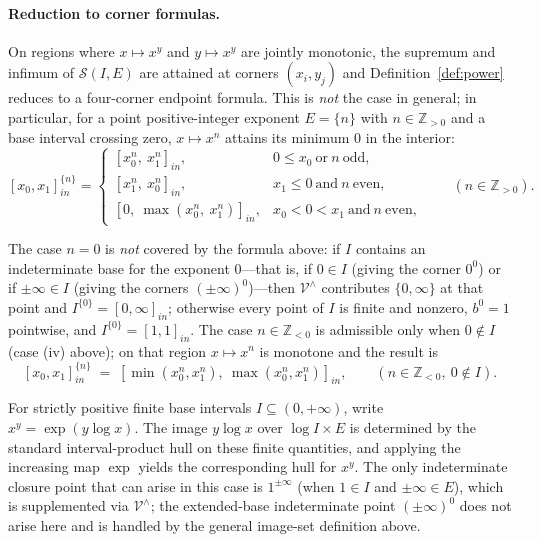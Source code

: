 \documentclass[11pt,a4paper]{article}
\theoremstyle{paperdef}
\newcommand{\inI}[1]{[#1]_{in}}
\newcommand{\Vhat}{\mathcal{V}^{\wedge}}
\begin{document}
\paragraph{Reduction to corner formulas.} On regions where
$x \mapsto x^y$ and $y \mapsto x^y$ are jointly monotonic, the
supremum and infimum of $\mathcal{S}(I, E)$ are attained at corners
$(x_i, y_j)$ and Definition~\ref{def:power} reduces to a four-corner
endpoint formula. This is \emph{not} the case in general; in
particular, for a point positive-integer exponent $E = \{n\}$ with
$n \in \mathbb{Z}_{>0}$ and a base interval crossing zero,
$x \mapsto x^n$ attains its minimum $0$ in the interior:
\[
\inI{x_0, x_1}^{\{n\}} =
\begin{cases}
\inI{x_0^{n},\ x_1^{n}}, & 0 \le x_0\ \text{or}\ n\ \text{odd}, \\
\inI{x_1^{n},\ x_0^{n}}, & x_1 \le 0\ \text{and}\ n\ \text{even}, \\
\inI{0,\ \max(x_0^{n},\ x_1^{n})}, & x_0 < 0 < x_1\ \text{and}\ n\ \text{even},
\end{cases}
\qquad (n \in \mathbb{Z}_{>0}).
\]

The case $n = 0$ is \emph{not} covered by the formula above: if $I$
contains an indeterminate base for the exponent $0$---that is, if
$0 \in I$ (giving the corner $0^0$) or if $\pm\infty \in I$ (giving
the corners $(\pm\infty)^{0}$)---then $\Vhat$ contributes
$\{0, \infty\}$ at that point and $I^{\{0\}} = \inI{0, \infty}$;
otherwise every point of $I$ is finite and nonzero, $b^{0} = 1$
pointwise, and $I^{\{0\}} = \inI{1, 1}$. The case
$n \in \mathbb{Z}_{<0}$ is admissible only when $0 \notin I$ (case
(iv) above); on that region $x \mapsto x^n$ is monotone and the
result is
\[
\inI{x_0, x_1}^{\{n\}}
\;=\; \inI{\min(x_0^n, x_1^n),\ \max(x_0^n, x_1^n)},
\qquad (n \in \mathbb{Z}_{<0},\ 0 \notin I).
\]

For strictly positive finite base intervals $I \subseteq (0, +\infty)$,
write $x^{y} = \exp(y \log x)$. The image $y \log x$ over
$\log I \times E$ is determined by the standard interval-product hull
on these finite quantities, and applying the increasing map $\exp$
yields the corresponding hull for $x^{y}$. The only indeterminate
closure point that can arise in this case is $1^{\pm\infty}$ (when
$1 \in I$ and $\pm\infty \in E$), which is supplemented via $\Vhat$;
the extended-base indeterminate point $(\pm\infty)^{0}$ does not
arise here and is handled by the general image-set definition above.
\end{document}
